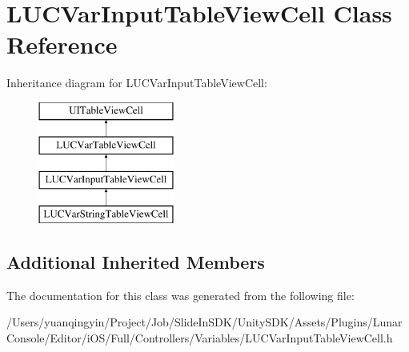 \hypertarget{interface_l_u_c_var_input_table_view_cell}{}\section{L\+U\+C\+Var\+Input\+Table\+View\+Cell Class Reference}
\label{interface_l_u_c_var_input_table_view_cell}
Inheritance diagram for L\+U\+C\+Var\+Input\+Table\+View\+Cell\+:\begin{figure}[H]
\begin{center}
\leavevmode
\includegraphics[height=4.000000cm]{interface_l_u_c_var_input_table_view_cell}
\end{center}
\end{figure}
\subsection*{Additional Inherited Members}


The documentation for this class was generated from the following file\+:\begin{DoxyCompactItemize}
\item 
/\+Users/yuanqingyin/\+Project/\+Job/\+Slide\+In\+S\+D\+K/\+Unity\+S\+D\+K/\+Assets/\+Plugins/\+Lunar\+Console/\+Editor/i\+O\+S/\+Full/\+Controllers/\+Variables/L\+U\+C\+Var\+Input\+Table\+View\+Cell.\+h\end{DoxyCompactItemize}
